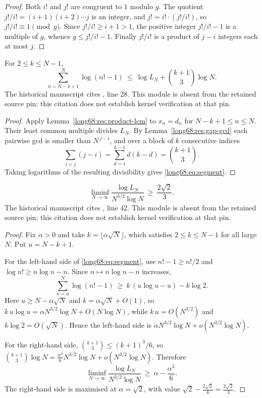 \documentclass[11pt]{article}
\newcommand{\Lc}{L}
\begin{document}
\begin{proof}
Both $i!$ and $j!$ are congruent to $1$ modulo $g$.  The quotient
$j!/i!=(i+1)(i+2)\cdots j$ is an integer, and $j!=i!\cdot(j!/i!)$, so
$j!/i!\equiv1\pmod g$.  Since $j!/i!\ge i+1>1$, the positive integer
$j!/i!-1$ is a multiple of $g$, whence $g\le j!/i!-1$.  Finally
$j!/i!$ is a product of $j-i$ integers each at most $j$.
\end{proof}

\begin{lemma}\label{long68:res:segment}
For $2\le k\le N-1$,
\begin{equation}\label{long68:eq:segment}
 \sum_{n=N-k+1}^{N}\log(n!-1)
 \ \le\ \log \Lc_N+\binom{k+1}{3}\log N.
\end{equation}
  The historical manuscript cites , line 28. This module is absent from the retained source pin; this citation does not establish kernel verification at that pin.

\end{lemma}

\begin{proof}
Apply Lemma~\ref{long68:res:product-lcm} to $x_n=d_n$ for $N-k+1\le n\le N$.  Their
least common multiple divides $\Lc_N$.  By Lemma~\ref{long68:res:gap-gcd} each
pairwise gcd is smaller than $N^{\,j-i}$, and over a block of $k$ consecutive
indices
\[
 \sum_{i<j}(j-i)=\sum_{d=1}^{k-1}d(k-d)=\binom{k+1}{3}.
\]
Taking logarithms of the resulting divisibility gives \eqref{long68:eq:segment}.
\end{proof}

\begin{theorem}\label{long68:res:lcm-growth}
\[
 \liminf_{N\to\infty}\frac{\log \Lc_N}{N^{3/2}\log N}
 \ \ge\ \frac{2\sqrt2}{3}.
\]
  The historical manuscript cites , line 42. This module is absent from the retained source pin; this citation does not establish kernel verification at that pin.
\end{theorem}

\begin{proof}
Fix $\alpha>0$ and take $k=\lfloor\alpha\sqrt N\rfloor$, which satisfies
$2\le k\le N-1$ for all large $N$.  Put $u=N-k+1$.

For the left-hand side of \eqref{long68:eq:segment}, use $n!-1\ge n!/2$ and
$\log n!\ge n\log n-n$.  Since $n\mapsto n\log n-n$ increases,
\[
 \sum_{n=u}^{N}\log(n!-1)\ \ge\ k\,(u\log u-u)-k\log2 .
\]
Here $u\ge N-\alpha\sqrt N$ and $k=\alpha\sqrt N+O(1)$, so
$k\,u\log u=\alpha N^{3/2}\log N+O(N\log N)$, while $k\,u=O(N^{3/2})$ and
$k\log2=O(\sqrt N)$.  Hence the left-hand side is
$\alpha N^{3/2}\log N+o(N^{3/2}\log N)$.

For the right-hand side, $\binom{k+1}{3}\le(k+1)^3/6$, so
$\binom{k+1}{3}\log N=\tfrac{\alpha^3}{6}N^{3/2}\log N+o(N^{3/2}\log N)$.
Therefore
\[
 \liminf_{N\to\infty}\frac{\log \Lc_N}{N^{3/2}\log N}
 \ \ge\ \alpha-\frac{\alpha^3}{6}.
\]
The right-hand side is maximised at $\alpha=\sqrt2$, with value
$\sqrt2-\tfrac{2\sqrt2}{6}=\tfrac{2\sqrt2}{3}$.
\end{proof}
\end{document}
